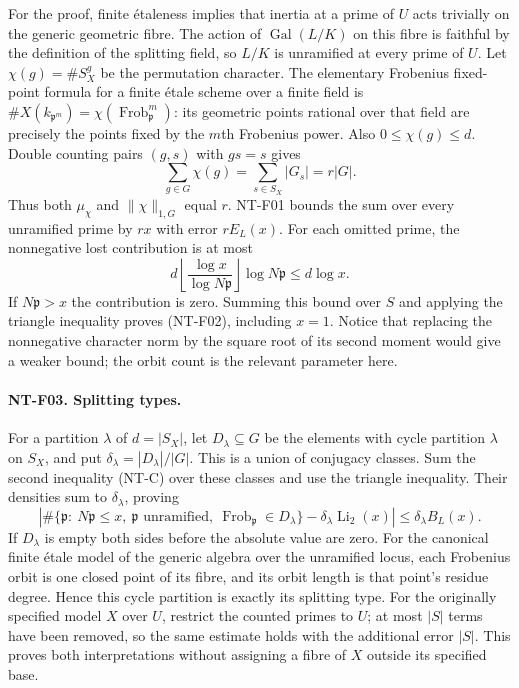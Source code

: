 \documentclass[11pt,a4paper]{article}
\begin{document}
For the proof, finite \'{e}taleness implies that inertia at a prime of $U$
acts trivially on the generic geometric fibre.  The action of
$\operatorname{Gal}(L/K)$ on this fibre is faithful by the definition of
the splitting field, so $L/K$ is unramified at every prime of $U$.
Let $\chi(g)=\#S_X^g$ be the permutation character.  The elementary
Frobenius fixed-point formula for a finite \'{e}tale scheme over a finite
field is
$\#X(k_{\mathfrak p^m})=\chi(\operatorname{Frob}_{\mathfrak p}^{m})$:
its geometric points rational over that field are precisely the points
fixed by the $m$th Frobenius power.  Also $0\le\chi(g)\le d$.
Double counting pairs $(g,s)$ with $gs=s$ gives
\[
 \sum_{g\in G}\chi(g)=\sum_{s\in S_X}|G_s|=r|G|.
\]
Thus both $\mu_\chi$ and $\|\chi\|_{1,G}$ equal $r$.  NT-F01 bounds
the sum over every unramified prime by $rx$ with error $rE_L(x)$.
For each omitted prime, the nonnegative lost contribution is at most
\[
 d\left\lfloor\frac{\log x}{\log N\mathfrak p}\right\rfloor
          \log N\mathfrak p\le d\log x.
\]
If $N\mathfrak p>x$ the contribution is zero.  Summing this bound over
$S$ and applying the triangle inequality proves (NT-F02), including
$x=1$.  Notice that replacing the nonnegative character norm by the square
root of its second moment would give a weaker bound; the orbit count is
the relevant parameter here.

\paragraph{NT-F03. Splitting types.}
For a partition $\lambda$ of $d=|S_X|$, let $D_\lambda\subseteq G$ be
the elements with cycle partition $\lambda$ on $S_X$, and put
$\delta_\lambda=|D_\lambda|/|G|$.  This is a union of conjugacy classes.
Sum the second inequality (NT-C) over these classes and use the triangle
inequality.  Their densities sum to $\delta_\lambda$, proving
\[
 \left|\#\{\mathfrak p:\ N\mathfrak p\le x,\ \mathfrak p
 \text{ unramified},\ \operatorname{Frob}_{\mathfrak p}\in D_\lambda\}
 -\delta_\lambda\operatorname{Li}_2(x)\right|
 \le\delta_\lambda B_L(x).
\]
If $D_\lambda$ is empty both sides before the absolute value are zero.
For the canonical finite \'{e}tale model of the generic algebra over the
unramified locus, each Frobenius orbit is one closed point of its fibre,
and its orbit length is that point's residue degree.  Hence this cycle
partition is exactly its splitting type.  For the originally specified
model $X$ over $U$, restrict the counted primes to $U$; at most $|S|$
terms have been removed, so the same estimate holds with the additional
error $|S|$.  This proves both interpretations without assigning a fibre
of $X$ outside its specified base.
\end{document}
